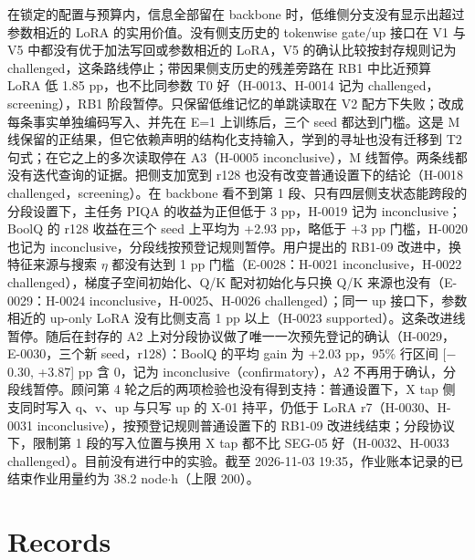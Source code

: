 \documentclass[11pt]{article}
\begin{document}
在锁定的配置与预算内，信息全部留在 backbone 时，低维侧分支没有显示出超过参数相近的 LoRA 的实用价值。没有侧支历史的 tokenwise gate/up 接口在 V1 与 V5 中都没有优于加法写回或参数相近的 LoRA，V5 的确认比较按封存规则记为 challenged，这条路线停止；带因果侧支历史的残差旁路在 RB1 中比近预算 LoRA 低 1.85 pp，也不比同参数 T0 好（H-0013、H-0014 记为 challenged，screening），RB1 阶段暂停。只保留低维记忆的单跳读取在 V2 配方下失败；改成每条事实单独编码写入、并先在 E=1 上训练后，三个 seed 都达到门槛。这是 M 线保留的正结果，但它依赖声明的结构化支持输入，学到的寻址也没有迁移到 T2 句式；在它之上的多次读取停在 A3（H-0005 inconclusive），M 线暂停。两条线都没有迭代查询的证据。把侧支加宽到 r128 也没有改变普通设置下的结论（H-0018 challenged，screening）。在 backbone 看不到第 1 段、只有四层侧支状态能跨段的分段设置下，主任务 PIQA 的收益为正但低于 3 pp，H-0019 记为 inconclusive；BoolQ 的 r128 收益在三个 seed 上平均为 +2.93 pp，略低于 +3 pp 门槛，H-0020 也记为 inconclusive，分段线按预登记规则暂停。用户提出的 RB1-09 改进中，换特征来源与搜索 $\eta$ 都没有达到 1 pp 门槛（E-0028：H-0021 inconclusive，H-0022 challenged），梯度子空间初始化、Q/K 配对初始化与只换 Q/K 来源也没有（E-0029：H-0024 inconclusive，H-0025、H-0026 challenged）；同一 up 接口下，参数相近的 up-only LoRA 没有比侧支高 1 pp 以上（H-0023 supported）。这条改进线暂停。随后在封存的 A2 上对分段协议做了唯一一次预先登记的确认（H-0029，E-0030，三个新 seed，r128）：BoolQ 的平均 gain 为 +2.03 pp，95\% 行区间 [$-$0.30, +3.87] pp 含 0，记为 inconclusive（confirmatory），A2 不再用于确认，分段线暂停。顾问第 4 轮之后的两项检验也没有得到支持：普通设置下，X tap 侧支同时写入 q、v、up 与只写 up 的 X-01 持平，仍低于 LoRA r7（H-0030、H-0031 inconclusive），按预登记规则普通设置下的 RB1-09 改进线结束；分段协议下，限制第 1 段的写入位置与换用 X tap 都不比 SEG-05 好（H-0032、H-0033 challenged）。目前没有进行中的实验。截至 2026-11-03 19:35，作业账本记录的已结束作业用量约为 38.2 node$\cdot$h（上限 200）。

\appendix

\section{Records}
\end{document}

